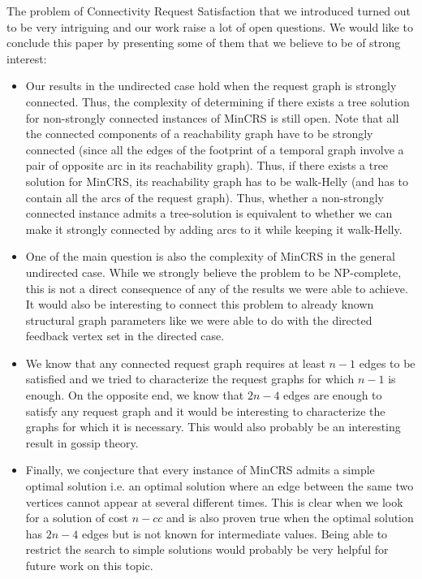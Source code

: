 \documentclass[11pt]{article}%
\begin{document}
The problem of Connectivity Request Satisfaction that we introduced turned out to be very intriguing and our work raise a lot of open questions. We would like to conclude this paper by presenting some of them that we believe to be of strong interest:
\begin{itemize}
\item Our results in the undirected case hold when the request graph is strongly connected. Thus, the complexity of determining if there exists a tree solution for non-strongly connected instances of MinCRS is still open. Note that all the connected components of a reachability graph have to be strongly connected (since all the edges of the footprint of a temporal graph involve a pair of opposite arc in its reachability graph). Thus, if there exists a tree solution for MinCRS, its reachability graph has to be walk-Helly (and has to contain all the arcs of the request graph). Thus, whether a non-strongly connected instance admits a tree-solution is equivalent to whether we can make it strongly connected by adding arcs to it while keeping it walk-Helly.
\item One of the main question is also the complexity of MinCRS in the general undirected case. While we strongly believe the problem to be NP-complete, this is not a direct consequence of any of the results we were able to achieve. It would also be interesting to connect this problem to already known structural graph parameters like we were able to do with the directed feedback vertex set in the directed case.
\item We know that any connected request graph requires at least $n-1$ edges to be satisfied and we tried to characterize the request graphs for which $n-1$ is enough. On the opposite end, we know that $2n-4$ edges are enough to satisfy any request graph and it would be interesting to characterize the graphs for which it is necessary. This would also probably be an interesting result in gossip theory.
\item Finally, we conjecture that every instance of MinCRS admits a simple optimal solution i.e. an optimal solution where an edge between the same two vertices cannot appear at several different times. This is clear when we look for a solution of cost $n-cc$ and is also proven true when the optimal solution has $2n-4$ edges but is not known for intermediate values. Being able to restrict the search to simple solutions would probably be very helpful for future work on this topic.
\end{itemize}

%


\end{document}
